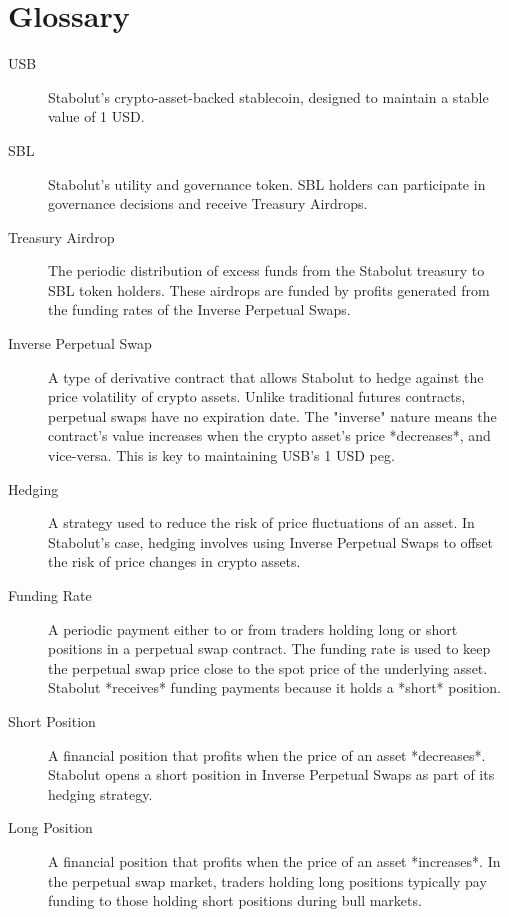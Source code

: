 \documentclass[11pt, a4paper]{article} %
\begin{document}
\section*{Glossary}
\begin{description}
\item[USB] Stabolut's crypto-asset-backed stablecoin, designed to maintain a stable value of 1 USD.

\item[SBL] Stabolut's utility and governance token. SBL holders can participate in governance decisions and receive Treasury Airdrops.

\item[Treasury Airdrop] The periodic distribution of excess funds from the Stabolut treasury to SBL token holders.  These airdrops are funded by profits generated from the funding rates of the Inverse Perpetual Swaps.

\item[Inverse Perpetual Swap] A type of derivative contract that allows Stabolut to hedge against the price volatility of crypto assets.  Unlike traditional futures contracts, perpetual swaps have no expiration date.  The "inverse" nature means the contract's value increases when the crypto asset's price *decreases*, and vice-versa. This is key to maintaining USB's 1 USD peg.

\item[Hedging] A strategy used to reduce the risk of price fluctuations of an asset. In Stabolut's case, hedging involves using Inverse Perpetual Swaps to offset the risk of price changes in crypto assets.

\item[Funding Rate] A periodic payment either to or from traders holding long or short positions in a perpetual swap contract.  The funding rate is used to keep the perpetual swap price close to the spot price of the underlying asset.  Stabolut *receives* funding payments because it holds a *short* position.

\item[Short Position] A financial position that profits when the price of an asset *decreases*.  Stabolut opens a short position in Inverse Perpetual Swaps as part of its hedging strategy.

\item[Long Position] A financial position that profits when the price of an asset *increases*.  In the perpetual swap market, traders holding long positions typically pay funding to those holding short positions during bull markets.


\end{description}
\end{document}

